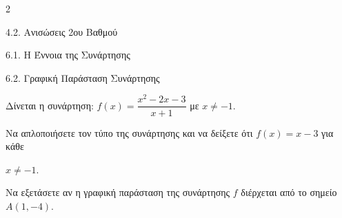 \begin{ylh}{2}
    \item 4.2. Ανισώσεις 2ου Βαθμού
    \item 6.1. Η Έννοια της Συνάρτησης
    \item 6.2. Γραφική Παράσταση Συνάρτησης
\end{ylh}
Δίνεται η συνάρτηση: $f(x) = \dfrac{x^{2} - 2x - 3}{x + 1}$ με $x \neq - 1$.
\begin{alist}
\item Να απλοποιήσετε τον τύπο της συνάρτησης και να δείξετε ότι $f(x) = x - 3$ για κάθε

$x \neq - 1$.
\item Να εξετάσετε αν η γραφική παράσταση της συνάρτησης $f$ διέρχεται από το σημείο $A(1, - 4)$.
\end{alist}

